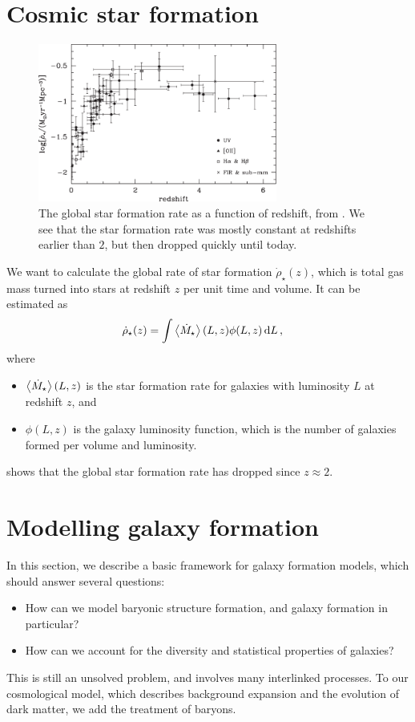 \section{Cosmic star formation}
\begin{figure}
	\includegraphics[width=0.7\textwidth]{img/ch-05/star-formation-rate.pdf}
	\caption{The global star formation rate as a function of redshift, from \cite{galaxy-formation}. We see that the star formation rate was mostly constant at redshifts earlier than $2$, but then dropped quickly until today.}
	\label{fig:star-formation-rate}
\end{figure}
We want to calculate the global rate of star formation $\dot{\rho}_\star(z)$, which is total gas mass turned into stars at redshift $z$ per unit time and volume. It can be estimated as
\begin{align*}
	\dot{\rho}_\star(z)
	&= \int   \left\langle \dot{M}_\star \right\rangle(L, z) \phi(L, z) \dd{L},
\end{align*}
where
\begin{itemize}
	\item $\left\langle \dot{M}_\star \right\rangle(L,z)$ is the star formation rate for galaxies with luminosity $L$ at redshift $z$, and
	\item $\phi(L, z)$ is the galaxy luminosity function, which is the number of galaxies formed per volume and luminosity.
\end{itemize}

 shows that the global star formation rate has dropped since $z \approx 2$.

\section{Modelling galaxy formation}
In this section, we describe a basic framework for galaxy formation models, which should answer several questions:
\begin{itemize}[nolistsep]
	\item How can we model baryonic structure formation, and galaxy formation in particular?
	\item How can we account for the diversity and statistical properties of galaxies?
\end{itemize}
This is still an unsolved problem, and involves many interlinked processes.
To our cosmological model, which describes background expansion and the evolution of dark matter, we add the treatment of baryons.

